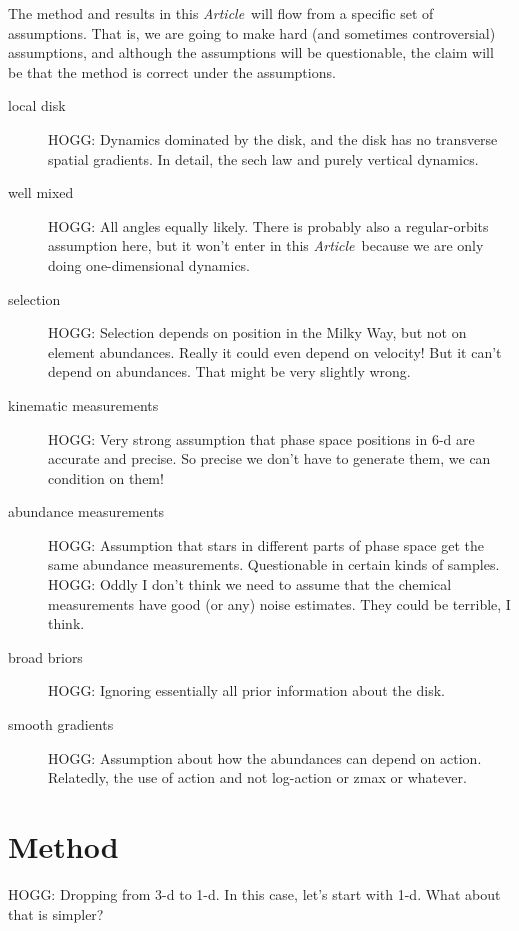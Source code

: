 \documentclass[modern]{aastex62}
\newcommand{\documentname}{\textsl{Article}}
\begin{document}
The method and results in this \documentname\ will flow from a specific set of
assumptions.
That is, we are going to make hard (and sometimes controversial) assumptions,
and although the assumptions will be questionable, the claim will be that the
method is correct under the assumptions.
\begin{description}
\item[local disk] HOGG: Dynamics dominated by the disk,
and the disk has no transverse spatial gradients. In detail, the sech law and purely
vertical dynamics.

\item[well mixed] HOGG: All angles equally likely. There is probably also a regular-orbits
assumption here, but it won't enter in this \documentname\ because we are only doing
one-dimensional dynamics.

\item[selection] HOGG: Selection depends on position in the Milky Way, but not
on element abundances. Really it could even depend on velocity! But it can't depend
on abundances. That might be very slightly wrong.

\item[kinematic measurements] HOGG: Very strong assumption that phase space positions
in 6-d are accurate and precise. So precise we don't have to generate them, we can
condition on them!

\item[abundance measurements] HOGG: Assumption that stars in different parts of phase
space get the same abundance measurements. Questionable in certain kinds of samples.
HOGG: Oddly I don't think we need to assume that the chemical measurements have good
(or any) noise estimates. They could be terrible, I think.

\item[broad briors] HOGG: Ignoring essentially all prior information about the disk.

\item[smooth gradients] HOGG: Assumption about how the abundances can depend on action.
Relatedly, the use of action and not log-action or zmax or whatever.
\end{description}

\section{Method}

HOGG: Dropping from 3-d to 1-d. In this case, let's start with 1-d. What about that is simpler?
\end{document}
